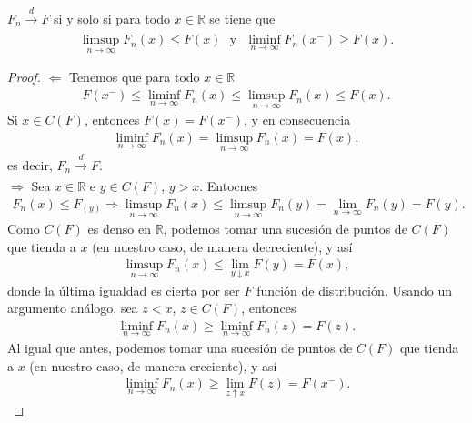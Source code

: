 \begin{lema}
    $F_n \xrightarrow[]{d} F$ si y solo si para todo $x \in \mathbb{R}$ se tiene que
    \begin{align*}
        \limsup_{n \to \infty} F_n(x) \leq F(x) \ \ \ \text{y} \ \ \ \liminf_{n \to \infty} F_n(x^-) \ge F(x).
    \end{align*}
\end{lema}

\begin{proof}
    $\boxed{\Longleftarrow}$ Tenemos que para todo $x \in \mathbb{R}$
    \begin{align*}
        F(x^-) \leq \liminf_{n \to \infty} F_n(x) \leq \limsup_{n \to \infty} F_n(x) \leq F(x).
    \end{align*}
    Si $x \in C(F)$, entonces $F(x) = F(x^-)$, y en consecuencia
    \begin{align*}
        \liminf_{n \to \infty} F_n(x) = \limsup_{n \to \infty} F_n(x) = F(x),
    \end{align*}
    es decir, $F_n \xrightarrow[]{d} F$.
    \\
    \newline
    $\boxed{\Longrightarrow}$ Sea $x \in \mathbb{R}$ e $y \in C(F)$, $y > x$. Entocnes
    \begin{align*}
        F_n(x) \leq F_(y) \Longrightarrow \limsup_{n \to \infty} F_n(x) \leq \limsup_{n \to \infty} F_n(y) = \lim_{n \to \infty} F_n(y) = F(y).
    \end{align*}
    Como $C(F)$ es denso en $\mathbb{R}$, podemos tomar una sucesión de puntos de $C(F)$ que tienda a $x$ (en nuestro caso, de manera decreciente), y así
    \begin{align*}
        \limsup_{n \to \infty} F_n(x) \leq \lim_{y \downarrow x} F(y) = F(x),
    \end{align*}
    donde la última igualdad es cierta por ser $F$ función de distribución. Usando un argumento análogo, sea $z < x$, $z \in C(F)$, entonces
    \begin{align*}
        \liminf_{n \to \infty} F_n(x) \ge \liminf_{n \to \infty} F_n(z) = F(z).
    \end{align*}
    Al igual que antes, podemos tomar una sucesión de puntos de $C(F)$ que tienda a $x$ (en nuestro caso, de manera creciente), y así
    \begin{align*}
        \liminf_{n \to \infty} F_n(x) \ge \lim_{z \uparrow x} F(z) = F(x^-).
    \end{align*}
\end{proof}

